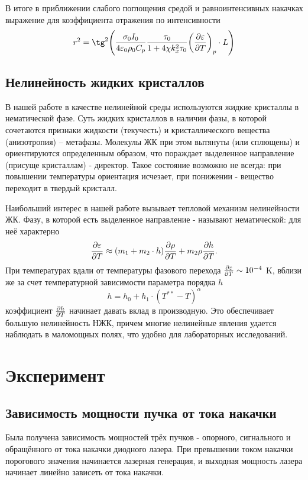 \documentclass[a5paper,11pt]{extarticle}
\begin{document}
В итоге в приближении слабого поглощения средой и равноинтенсивных накачках выражение для коэффициента отражения по интенсивности 
\begin{equation}
	r^2 = \tg^2\qty(\frac{\sigma_0 I_0}{4\varepsilon_0 \rho_0 C_p}\frac{\tau_0}{1+4\chi k_x^2 \tau_0} \qty(\pdv{\varepsilon}{T})_p \cdot L)
\end{equation}


\subsection{Нелинейность жидких кристаллов}
В нашей работе в качестве нелинейной среды используются жидкие кристаллы в нематической фазе. Суть жидких кристаллов в наличии фазы, в которой сочетаются признаки жидкости (текучесть) и кристаллического вещества (анизотропия) -- метафазы. Молекулы ЖК при этом вытянуты (или сплющены) и ориентируются определенным образом, что пораждает выделенное направление (присуще кристаллам) - директор. Такое состояние возможно не всегда: при повышении температуры ориентация исчезает, при понижении - вещество переходит в твердый кристалл. 

Наибольший интерес в нашей работе вызывает тепловой механизм нелинейности ЖК. Фазу, в которой есть выделенное направление - называют нематической: для неё характерно 
\begin{equation}
	\pdv{\varepsilon}{T} \approx (m_1+m_2\cdot h) \pdv{\rho}{T} +m_2 \rho \pdv{h}{T}.
\end{equation}
При температурах вдали от температуры фазового перехода $\pdv{\varepsilon}{T} \sim 10^{-4}$ K, вблизи же за счет температурной зависимости параметра порядка $h$
\begin{equation}
	h = h_0 + h_1 \cdot (T^{**} - T)^\alpha
\end{equation}
коэффициент $\pdv{h}{T}$ начинает давать вклад в производную. Это обеспечивает большую нелинейность НЖК, причем многие нелинейные явления удается наблюдать в маломощных полях, что удобно для лабораторных исследований.


\section{Эксперимент}
\subsection{Зависимость мощности пучка от тока накачки}
Была получена зависимость мощностей трёх пучков - опорного, сигнального и обращённого от тока накачки диодного лазера. При превышении током накачки порогового значения начинается лазерная генерация, и выходная мощность лазера начинает линейно зависеть от тока накачки. 
\end{document}
